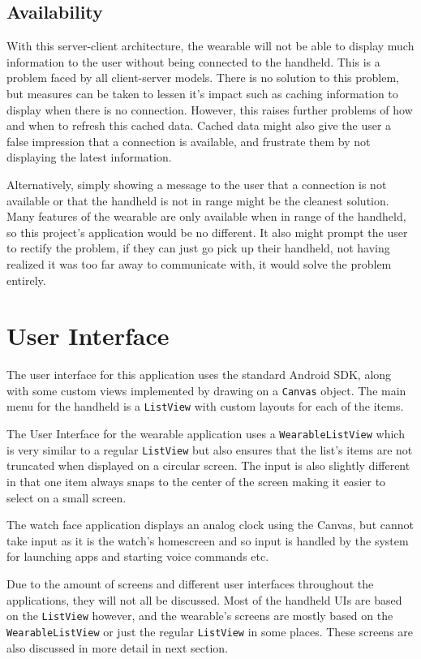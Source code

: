 \subsection{Availability}

With this server-client architecture, the wearable will not be able to display
much information to the user without being connected to the handheld. This is
a problem faced by all client-server models. There is no solution to this
problem, but measures can be taken to lessen it's impact such as caching
information to display when there is no connection. However, this raises further
problems of how and when to refresh this cached data. Cached data might also
give the user a false impression that a connection is available, and frustrate
them by not displaying the latest information.

Alternatively, simply showing a message to the user that a connection is not
available or that the handheld is not in range might be the cleanest solution.
Many features of the wearable are only available when in range of the handheld,
so this project's application would be no different. It also might prompt the
user to rectify the problem, if they can just go pick up their handheld, not
having realized it was too far away to communicate with, it would solve the
problem entirely.

\section{User Interface}

The user interface for this application uses the standard Android SDK, along
with some custom views implemented by drawing on a \texttt{Canvas} object.
The main menu for the handheld is a \texttt{ListView} with custom layouts
for each of the items.

The User Interface for the wearable application uses a \texttt{WearableListView}
which is very similar to a regular \texttt{ListView} but also ensures that the
list's items are not truncated when displayed on a circular screen. The input
is also slightly different in that one item always snaps to the center of the
screen making it easier to select on a small screen.

The watch face application displays an analog clock using the Canvas, but cannot
take input as it is the watch's homescreen and so input is handled by the system
for launching apps and starting voice commands etc.

Due to the amount of screens and different user interfaces throughout the
applications, they will not all be discussed. Most of the handheld UIs are based
on the \texttt{ListView} however, and the wearable's screens are mostly based
on the \texttt{WearableListView} or just the regular \texttt{ListView} in some
places. These screens are also discussed in more detail in next section.

